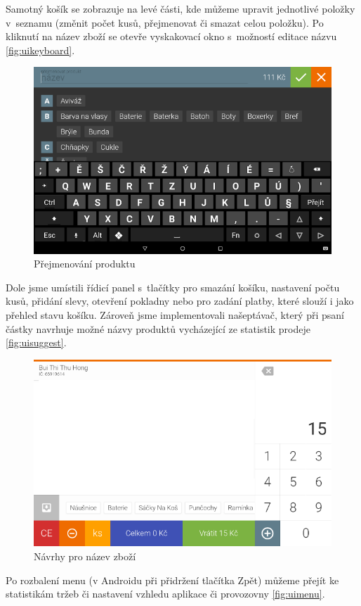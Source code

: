 \documentclass[a4paper,11pt,oneside]{article}
\begin{document}
Samotný košík se zobrazuje na levé části, kde můžeme upravit jednotlivé položky v~seznamu (změnit počet kusů, přejmenovat či smazat celou položku). Po kliknutí na název zboží se otevře vyskakovací okno s~možností editace názvu \eqref{fig:uikeyboard}.

\begin{figure}[H]
	\centering
	\includegraphics[width=0.7\linewidth]{../ui_keyboard}
	\caption{Přejmenování produktu}
	\label{fig:uikeyboard}
\end{figure}


Dole jsme umístili řídicí panel s~tlačítky pro smazání košíku, nastavení počtu kusů, přidání slevy, otevření pokladny nebo pro zadání platby, které slouží i jako přehled stavu košíku. Zároveň jsme implementovali našeptávač, který při psaní částky navrhuje možné názvy produktů vycházející ze statistik prodeje \eqref{fig:uisuggest}.

\begin{figure}[H]
	\centering
	\includegraphics[width=0.7\linewidth]{../ui_suggest}
	\caption{Návrhy pro název zboží}
	\label{fig:uisuggest}
\end{figure}


Po rozbalení menu (v Androidu při přidržení tlačítka Zpět) můžeme přejít ke statistikám tržeb či nastavení vzhledu aplikace či provozovny \eqref{fig:uimenu}.
\end{document}
